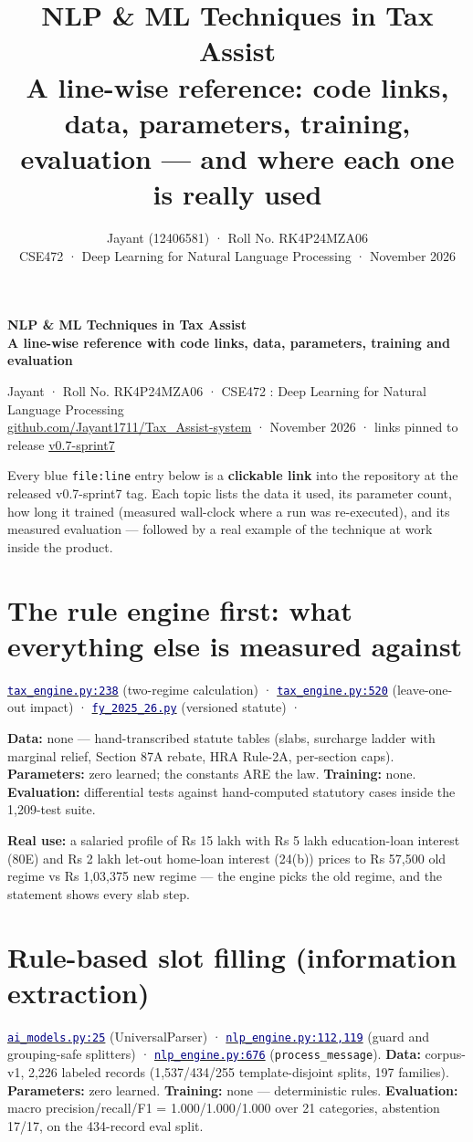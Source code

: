 \documentclass[11pt,a4paper]{article}
\title{\textcolor{ink}{\bigger NLP \& ML Techniques in Tax Assist\\[2mm]
\large A line-wise reference: code links, data, parameters, training, evaluation --- and where each one is really used}}
\author{\normalsize Jayant (12406581) · Roll No. RK4P24MZA06\\
\normalsize CSE472 · Deep Learning for Natural Language Processing · November 2026}
\date{}
\newcommand{\code}[2]{\href{https://github.com/Jayant1711/Tax_Assist-system/blob/v0.7-sprint7/#1}{\texttt{\textcolor{navy}{#2}}}}
\newcommand{\facts}[1]{{\small\textcolor{muted}{#1}\par}}
\renewcommand{\maketitle}{
  \begin{center}
    {\fontsize{22}{26}\selectfont\bfseries\color{ink} NLP \& ML Techniques in Tax Assist\\[3mm]
     \fontsize{14}{18}\selectfont\bfseries\color{navy} A line-wise reference with code links, data, parameters, training and evaluation}
  \end{center}
  \vspace{2mm}
  \begin{center}
    {\normalsize Jayant \;·\; Roll No. RK4P24MZA06 \;·\; CSE472 : Deep Learning for Natural Language Processing\\[1mm]
     \small\color{muted} \href{https://github.com/Jayant1711/Tax_Assist-system/blob/v0.7-sprint7/README.md}{github.com/Jayant1711/Tax\_Assist-system} \;·\; November 2026 \;·\; links pinned to release \href{https://github.com/Jayant1711/Tax_Assist-system/releases/tag/v0.7-sprint7}{v0.7-sprint7}}
  \end{center}
  \vspace{1mm}
}
\begin{document}
\maketitle
\thispagestyle{fancy}

\begin{tcolorbox}[colback=tintbg, colframe=tintbg, boxrule=0pt, arc=2mm,
  left=8pt, right=8pt, top=6pt, bottom=6pt]
\small
Every blue \texttt{file:line} entry below is a \textbf{clickable link} into the
repository at the released v0.7-sprint7 tag. Each topic lists the data it used,
its parameter count, how long it trained (measured wall-clock where a run was
re-executed), and its measured evaluation --- followed by a real example of the
technique at work inside the product.
\end{tcolorbox}

\section{The rule engine first: what everything else is measured against}
\facts{\code{backend/tax_engine.py}{tax\_engine.py:238} (two-regime calculation) ·
\code{backend/tax_engine.py}{tax\_engine.py:520} (leave-one-out impact) ·
\code{backend/tax\_rules/fy\_2025\_26.py}{fy\_2025\_26.py} (versioned statute) ·
\facts{} \textbf{Data:} none — hand-transcribed statute tables (slabs, surcharge
ladder with marginal relief, Section 87A rebate, HRA Rule-2A, per-section caps).
\textbf{Parameters:} zero learned; the constants ARE the law. \textbf{Training:}
none. \textbf{Evaluation:} differential tests against hand-computed statutory
cases inside the 1,209-test suite.}

\begin{examplebox}
\textbf{Real use:} a salaried profile of Rs 15 lakh with Rs 5 lakh education-loan
interest (80E) and Rs 2 lakh let-out home-loan interest (24(b)) prices to
Rs 57,500 old regime vs Rs 1,03,375 new regime --- the engine picks the old
regime, and the statement shows every slab step.
\end{examplebox}

\section{Rule-based slot filling (information extraction)}
\facts{\code{backend/ai\_models.py}{ai\_models.py:25} (UniversalParser) ·
\code{backend/nlp\_engine.py}{nlp\_engine.py:112,119} (guard and grouping-safe
splitters) · \code{backend/nlp\_engine.py}{nlp\_engine.py:676}
(\texttt{process\_message}). \textbf{Data:} corpus-v1, 2,226 labeled records
(1,537/434/255 template-disjoint splits, 197 families). \textbf{Parameters:} zero
learned. \textbf{Training:} none --- deterministic rules. \textbf{Evaluation:}
macro precision/recall/F1 = 1.000/1.000/1.000 over 21 categories, abstention
17/17, on the 434-record eval split.}
\end{document}
